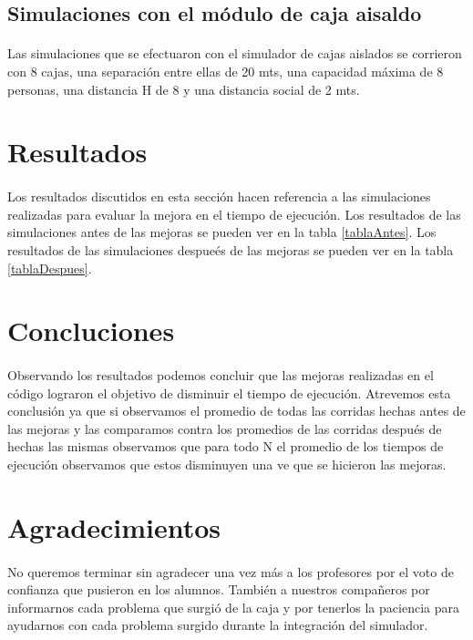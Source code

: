 \documentclass{article}
\begin{document}
\subsection{Simulaciones con el módulo de caja aisaldo}

\paragraph{}
Las simulaciones que se efectuaron con el simulador de cajas aislados se corrieron con 8 cajas, una separación entre ellas de 20 mts, una capacidad máxima de 8 personas, una distancia H de 8 y una distancia social de 2 mts.



\section{Resultados}
\paragraph{}
Los resultados discutidos en esta sección hacen referencia a las simulaciones realizadas para evaluar la mejora en el tiempo de ejecución.
Los resultados de las simulaciones antes de las mejoras se pueden ver en la tabla \ref{tablaAntes}.
Los resultados de las simulaciones despue\'es de las mejoras se pueden ver en la tabla \ref{tablaDespues}.

\section{Concluciones}
\paragraph{}
Observando los resultados podemos concluir que las mejoras realizadas en el código lograron el objetivo de disminuir el tiempo de ejecución. Atrevemos esta conclusión ya que si observamos el promedio de todas las corridas hechas antes de las mejoras y las
comparamos contra los promedios de las corridas después de hechas las mismas observamos que para todo N el promedio de los tiempos de ejecución observamos que estos disminuyen una ve que se hicieron las mejoras.

\section{Agradecimientos}
\paragraph{}
No queremos terminar sin agradecer una vez más a los profesores por el voto de confianza que pusieron en los alumnos. También a nuestros compañeros por informarnos cada problema que surgió de la caja y por tenerlos la paciencia para
ayudarnos con cada problema surgido durante la integración del simulador.
\end{document}
